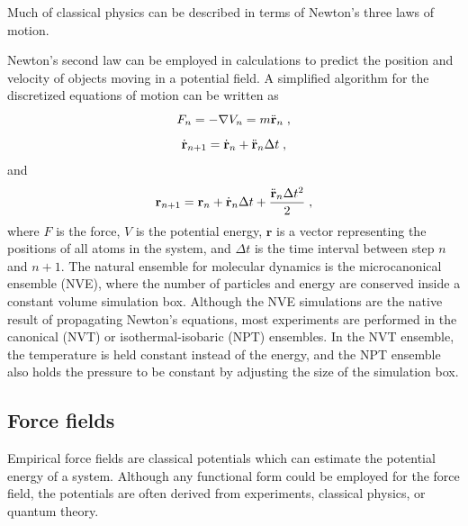 \documentclass[12pt]{report}
\begin{document}
Much of classical physics can be described in terms of Newton's three laws of
motion.
\begin{quote}
\end{quote}
Newton's second law can be employed in calculations to predict the position
and velocity of objects moving in a potential field. A simplified algorithm
for the discretized equations of motion can be written as
\begin{equation}
 F_{n} = -\nabla V_{n} = m\ddot {\textbf r}_{n} \; ,
\end{equation}
\begin{equation}
 \dot {\textbf r}_{n+1} = \dot {\textbf r}_{n}+\ddot {\textbf r}_{n}
 \Delta t \; ,
\end{equation}
and
\begin{equation}
 {\textbf r}_{n+1} = {\textbf r}_{n}+\dot {\textbf r}_{n}\Delta t
 +\frac{\ddot {\textbf r}_{n}\Delta t^2}{2} \; ,
\end{equation}
where $F$ is the force, $V$ is the potential energy, $\textbf{r}$ is a vector
representing the positions of all atoms in the system, and $\Delta t$ is the
time interval between step $n$ and $n+1$. The natural ensemble for
molecular dynamics is the microcanonical ensemble (NVE), where the number of
particles and energy are conserved inside a constant volume simulation box.
Although the NVE simulations are the native result of propagating Newton's
equations, most experiments are performed in the canonical (NVT) or
isothermal-isobaric (NPT) ensembles. In the NVT ensemble, the temperature is
held constant instead of the energy, and the NPT ensemble also holds the
pressure to be constant by adjusting the size of the simulation box.

\subsection{Force fields}

Empirical force fields are classical potentials which can estimate the
potential energy of a system. Although any functional form could be employed
for the force field, the potentials are often derived from experiments,
classical physics, or quantum theory. \\
\end{document}
